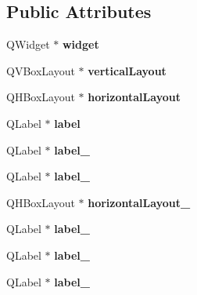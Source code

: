 \subsection*{\-Public \-Attributes}
\begin{DoxyCompactItemize}
\item 
\hypertarget{classUi__Dialog_ac29d40a685ece2dc888a3e37594dbc15}{\-Q\-Widget $\ast$ {\bfseries widget}}\label{classUi__Dialog_ac29d40a685ece2dc888a3e37594dbc15}

\item 
\hypertarget{classUi__Dialog_a02f973813b741621c5461918b3d9d4bb}{\-Q\-V\-Box\-Layout $\ast$ {\bfseries vertical\-Layout}}\label{classUi__Dialog_a02f973813b741621c5461918b3d9d4bb}

\item 
\hypertarget{classUi__Dialog_ae66a1da203f045e33d71ed5abd46d2a1}{\-Q\-H\-Box\-Layout $\ast$ {\bfseries horizontal\-Layout}}\label{classUi__Dialog_ae66a1da203f045e33d71ed5abd46d2a1}

\item 
\hypertarget{classUi__Dialog_ac3844fd0281707dc5535826da7506ca5}{\-Q\-Label $\ast$ {\bfseries label}}\label{classUi__Dialog_ac3844fd0281707dc5535826da7506ca5}

\item 
\hypertarget{classUi__Dialog_acfbb1773ba7dc7aa425b0b3b8981686a}{\-Q\-Label $\ast$ {\bfseries label\-\_}}\label{classUi__Dialog_acfbb1773ba7dc7aa425b0b3b8981686a}

\item 
\hypertarget{classUi__Dialog_a3bb3c83086d124c6e85906f15c8add64}{\-Q\-Label $\ast$ {\bfseries label\-\_}}\label{classUi__Dialog_a3bb3c83086d124c6e85906f15c8add64}

\item 
\hypertarget{classUi__Dialog_a289b49bcdd28408efe2510f029535c2b}{\-Q\-H\-Box\-Layout $\ast$ {\bfseries horizontal\-Layout\-\_}}\label{classUi__Dialog_a289b49bcdd28408efe2510f029535c2b}

\item 
\hypertarget{classUi__Dialog_a0f20bebec836535dc4cfcc33647dd2aa}{\-Q\-Label $\ast$ {\bfseries label\-\_}}\label{classUi__Dialog_a0f20bebec836535dc4cfcc33647dd2aa}

\item 
\hypertarget{classUi__Dialog_a640f65059bf215b0096f894e7ace21e3}{\-Q\-Label $\ast$ {\bfseries label\-\_}}\label{classUi__Dialog_a640f65059bf215b0096f894e7ace21e3}

\item 
\hypertarget{classUi__Dialog_a30b8516534f30c4241a55e3fb9dcd766}{\-Q\-Label $\ast$ {\bfseries label\-\_}}\label{classUi__Dialog_a30b8516534f30c4241a55e3fb9dcd766}


\end{DoxyCompactItemize}
